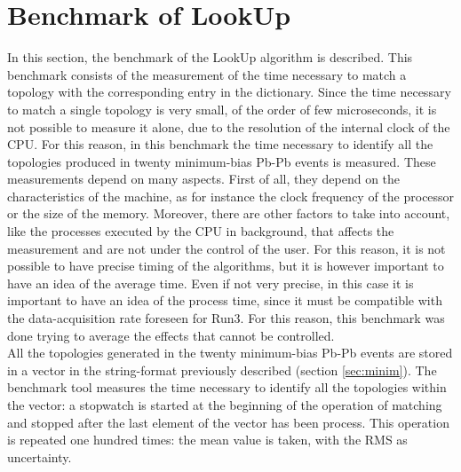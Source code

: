 \section{Benchmark of LookUp}
In this section, the benchmark of the LookUp algorithm is described. This benchmark consists of the measurement of the time necessary to match a topology with the corresponding entry in the dictionary. Since the time necessary to match a single topology is very small, of the order of few microseconds, it is not possible to measure it alone, due to the resolution of the internal clock of the CPU. For this reason, in this benchmark the time necessary to identify all the topologies produced in twenty minimum-bias Pb-Pb events is measured. These measurements depend on many aspects. First of all, they depend on the characteristics of the machine, as for instance the clock frequency of the processor or the size of the memory. Moreover, there are other factors to take into account, like the processes executed by the CPU in background, that affects the measurement and are not under the control of the user. For this reason, it is not possible to have precise timing of the algorithms, but it is however important to have an idea of the average time. Even if not very precise, in this case it is important to have an idea of the process time, since it must be compatible with the data-acquisition rate foreseen for Run3. For this reason, this benchmark was done trying to average the effects that cannot be controlled.\\
All the topologies generated in the twenty minimum-bias Pb-Pb events are stored in a vector in the string-format previously described (section \ref{sec:minim}). The benchmark tool measures the time necessary to identify all the topologies within the vector: a stopwatch is started at the beginning of the operation of matching and stopped after the last element of the vector has been process. This operation is repeated one hundred times: the mean value is taken, with the RMS as uncertainty.
%

